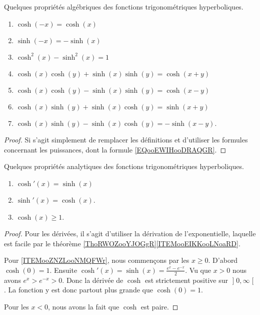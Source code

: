 \begin{proposition}     \label{PROPooUNHHooIksdoJ}
    Quelques propriétés algébriques des fonctions trigonométriques hyperboliques.
    \begin{enumerate}
        \item
            \( \cosh(-x)=\cosh(x)\)
        \item
            \( \sinh(-x)=-\sinh(x)\)
        \item
            \( \cosh^2(x)-\sinh^2(x)=1\)
        \item
            \( \cosh(x)\cosh(y)+\sinh(x)\sinh(y)=\cosh(x+y)\)
        \item       \label{ITEMooOJRFooUCUaDl}
            \( \cosh(x)\cosh(y)-\sinh(x)\sinh(y)=\cosh(x-y)\)
        \item
            \( \cosh(x)\sinh(y)+\sinh(x)\cosh(y)=\sinh(x+y)\)
        \item
            \( \cosh(x)\sinh(y)-\sinh(x)\cosh(y)=-\sinh(x-y)\).
    \end{enumerate}
\end{proposition}

\begin{proof}
    Si s'agit simplement de remplacer les définitions et d'utiliser les formules concernant les puissances, dont la formule \eqref{EQooEWIHooDRAQGR}.
\end{proof}

\begin{proposition}     \label{PROPooAOOHooXvLfrZ}
    Quelques propriétés analytiques des fonctions trigonométriques hyperboliques.
    \begin{enumerate}
        \item
            \( \cosh'(x)=\sinh(x)\)
        \item
            \( \sinh'(x)=\cosh(x)\).
        \item       \label{ITEMooZNZLooNMQFWr}
            \( \cosh(x)\geq 1\).
    \end{enumerate}
\end{proposition}

\begin{proof}
    Pour les dérivées, il s'agit d'utiliser la dérivation de l'exponentielle, laquelle est facile par le théorème \ref{ThoRWOZooYJOGgR}\ref{ITEMooEIKKooLNoaRD}.

    Pour \ref{ITEMooZNZLooNMQFWr}, nous commençons par les \( x\geq 0\). D'abord $\cosh(0)=1$. Ensuite \( \cosh'(x)=\sinh(x)=\frac{  e^{x}- e^{-x} }{ 2 }\). Vu que \( x> 0\) nous avons \(  e^{x}> e^{-x}>0\). Donc la dérivée de \( \cosh\) est strictement positive sur \( \mathopen] 0 , \infty \mathclose[\). La fonction y est donc partout plus grande que \( \cosh(0)=1\).

    Pour les \( x<0\), nous avons la fait que \( \cosh\) est paire.
\end{proof}

